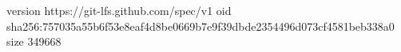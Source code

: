 version https://git-lfs.github.com/spec/v1
oid sha256:757035a55b6f53e8eaf4d8be0669b7e9f39dbde2354496d073cf4581beb338a0
size 349668
